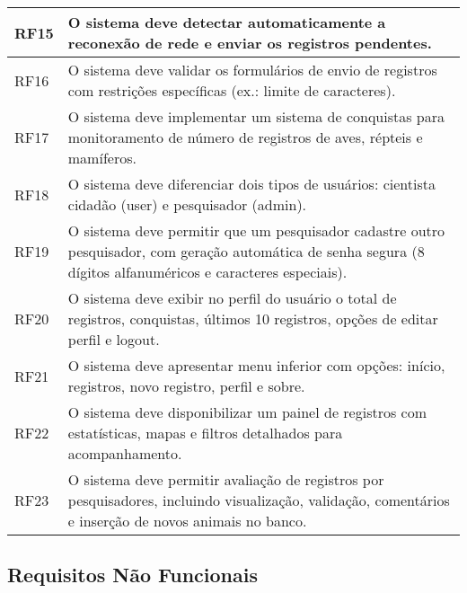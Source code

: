 \begin{table}[H]
\begin{tabular}{|p{2cm}|p{11cm}|}
    RF15 & O sistema deve detectar automaticamente a reconexão de rede e enviar os registros pendentes. \\ \hline
    RF16 & O sistema deve validar os formulários de envio de registros com restrições específicas (ex.: limite de caracteres). \\ \hline
    RF17 & O sistema deve implementar um sistema de conquistas para monitoramento de número de registros de aves, répteis e mamíferos. \\ \hline
    RF18 & O sistema deve diferenciar dois tipos de usuários: cientista cidadão (user) e pesquisador (admin). \\ \hline
    RF19 & O sistema deve permitir que um pesquisador cadastre outro pesquisador, com geração automática de senha segura (8 dígitos alfanuméricos e caracteres especiais). \\ \hline
    RF20 & O sistema deve exibir no perfil do usuário o total de registros, conquistas, últimos 10 registros, opções de editar perfil e logout. \\ \hline
    RF21 & O sistema deve apresentar menu inferior com opções: início, registros, novo registro, perfil e sobre. \\ \hline
    RF22 & O sistema deve disponibilizar um painel de registros com estatísticas, mapas e filtros detalhados para acompanhamento. \\ \hline
    RF23 & O sistema deve permitir avaliação de registros por pesquisadores, incluindo visualização, validação, comentários e inserção de novos animais no banco. \\ \hline
    \end{tabular}
    \end{table}

\subsection{Requisitos Não Funcionais}

